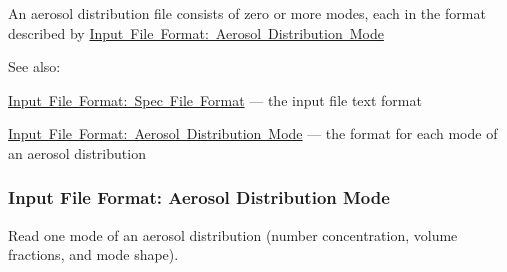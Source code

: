 An aerosol distribution file consists of zero or more modes, each in the format described by \mbox{\hyperlink{input_format_aero_mode}{Input File Format\+: Aerosol Distribution Mode}}

See also\+:
\begin{DoxyItemize}
\item \mbox{\hyperlink{spec_file_format}{Input File Format\+: Spec File Format}} --- the input file text format
\item \mbox{\hyperlink{input_format_aero_mode}{Input File Format\+: Aerosol Distribution Mode}} --- the format for each mode of an aerosol distribution 
\end{DoxyItemize}\hypertarget{input_format_aero_mode}{}\subsubsection{Input File Format\+: Aerosol Distribution Mode}\label{input_format_aero_mode}
Read one mode of an aerosol distribution (number concentration, volume fractions, and mode shape).


